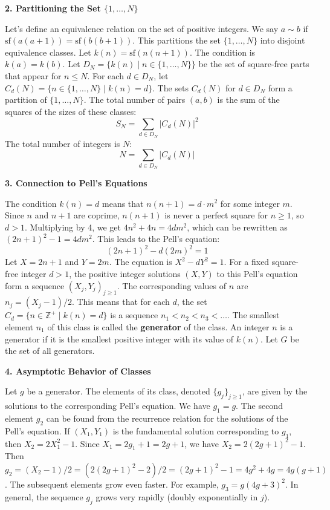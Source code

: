 \documentclass[12pt,a4paper]{article}
\theoremstyle{definition}
\begin{document}
    \textbf{2. Partitioning the Set $\{1, \dots, N\}$}

    Let's define an equivalence relation on the set of positive integers. We say $a \sim b$ if $\text{sf}(a(a+1)) = \text{sf}(b(b+1))$. This partitions the set $\{1, \dots, N\}$ into disjoint equivalence classes.
    Let $k(n) = \text{sf}(n(n+1))$. The condition is $k(a)=k(b)$.
    Let $D_N = \{k(n) \mid n \in \{1, \dots, N\}\}$ be the set of square-free parts that appear for $n \le N$.
    For each $d \in D_N$, let $C_d(N) = \{n \in \{1, \dots, N\} \mid k(n)=d\}$.
    The sets $C_d(N)$ for $d \in D_N$ form a partition of $\{1, \dots, N\}$.
    The total number of pairs $(a,b)$ is the sum of the squares of the sizes of these classes:
    \[ S_N = \sum_{d \in D_N} |C_d(N)|^2 \]
    The total number of integers is $N$:
    \[ N = \sum_{d \in D_N} |C_d(N)| \]

    \textbf{3. Connection to Pell's Equations}

    The condition $k(n)=d$ means that $n(n+1) = d \cdot m^2$ for some integer $m$.
    Since $n$ and $n+1$ are coprime, $n(n+1)$ is never a perfect square for $n \ge 1$, so $d>1$.
    Multiplying by 4, we get $4n^2+4n = 4dm^2$, which can be rewritten as $(2n+1)^2 - 1 = 4dm^2$.
    This leads to the Pell's equation:
    \[ (2n+1)^2 - d(2m)^2 = 1 \]
    Let $X = 2n+1$ and $Y = 2m$. The equation is $X^2 - dY^2 = 1$.
    For a fixed square-free integer $d>1$, the positive integer solutions $(X,Y)$ to this Pell's equation form a sequence $(X_j, Y_j)_{j \ge 1}$. The corresponding values of $n$ are $n_j = (X_j-1)/2$.
    This means that for each $d$, the set $C_d = \{n \in \mathbb{Z}^+ \mid k(n)=d\}$ is a sequence $n_1 < n_2 < n_3 < \dots$.
    The smallest element $n_1$ of this class is called the \textbf{generator} of the class. An integer $n$ is a generator if it is the smallest positive integer with its value of $k(n)$. Let $G$ be the set of all generators.

    \textbf{4. Asymptotic Behavior of Classes}

    Let $g$ be a generator. The elements of its class, denoted $\{g_j\}_{j\ge 1}$, are given by the solutions to the corresponding Pell's equation. We have $g_1=g$.
    The second element $g_2$ can be found from the recurrence relation for the solutions of the Pell's equation. If $(X_1, Y_1)$ is the fundamental solution corresponding to $g_1$, then $X_2=2X_1^2-1$.
    Since $X_1 = 2g_1+1 = 2g+1$, we have $X_2 = 2(2g+1)^2-1$.
    Then $g_2 = (X_2-1)/2 = (2(2g+1)^2-2)/2 = (2g+1)^2-1 = 4g^2+4g = 4g(g+1)$.
    The subsequent elements grow even faster. For example, $g_3 = g(4g+3)^2$.
    In general, the sequence $g_j$ grows very rapidly (doubly exponentially in $j$).
\end{document}
